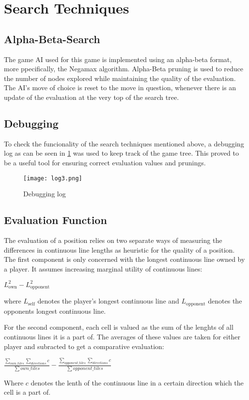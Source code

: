 \section{Search Techniques}

\subsection{Alpha-Beta-Search}
The game AI used for this game is implemented using an alpha-beta format, more ppecifically, the Negamax algorithm. Alpha-Beta pruning is used to reduce the number of nodes explored while maintaining the quality of the evaluation. The AI's move of choice is reset to the move in question, whenever there is an update of the evaluation at the very top of the search tree.

\subsection{Debugging}
To check the funcionality of the search techniques mentioned above, a debugging log as can be seen in \ref{fig:debugging} was used to keep track of the game tree. This proved to be a useful tool for ensuring correct evaluation values and prunings.
\begin{figure}[h]
    \centering
    \texttt{[image: log3.png]}
    \caption{Debugging log}
    \label{fig:debugging}
\end{figure}  

\subsection{Evaluation Function}
The evaluation of a position relies on two separate ways of measuring the differences in continuous line lengths as heuristic for the quality of a position. The first component is only concerned with the longest continuous line owned by a player. It assumes increasing marginal utility of continuous lines:
\begin{center}
    \begin{math}
        L_\mathrm{own}^2 - L_\mathrm{opponent}^2
    \end{math}
\end{center}
where $L_\mathrm{self}$ denotes the player's longest continuous line and $L_\mathrm{opponent}$ denotes the opponents longest continuous line.

For the second component, each cell is valued as the sum of the lenghts of all continuous lines it is a part of. The averages of these values are taken for either player and subracted to get a comparative evaluation:
\begin{center}
    \begin{math}
        \frac{\sum_{own\_tiles}\sum_{directions}c}{\sum{own\_tiles}} 
        - \frac{\sum_{opponent\_tiles}\sum_{directions}c}{\sum{opponent\_tiles}}
    \end{math}
\end{center}
Where $c$ denotes the lenth of the continuous line in a certain direction which the cell is a part of.


